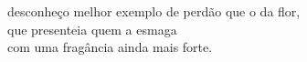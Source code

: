 desconheço melhor exemplo de perdão que o da flor,\\
que presenteia quem a esmaga\\
com uma fragância ainda mais forte.
